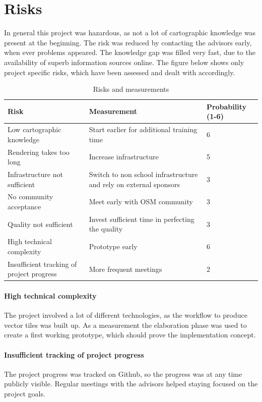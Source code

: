 \section{Risks}\label{risks}
In general this project was hazardous, as not a lot of cartographic knowledge was present at the beginning. The risk was reduced by contacting the advisors early, when ever problems appeared. The knowledge gap was filled very fast, due to the availability of superb information sources online. The figure below shows only project specific risks, which have been assessed and dealt with accordingly.

\begin{table}[H]
\centering
    \begin{tabular}{p{4.5cm} p{5.5cm} p{1.8cm}}
    \hline
    Risk & Measurement & Probability (1-6)\\
    \hline
    Low cartographic knowledge & Start earlier for additional training time & 6\\
    Rendering takes too long & Increase infrastructure & 5\\
    Infrastructure not sufficient & Switch to non school infrastructure and rely on external sponsors & 3\\
    No community acceptance & Meet early with OSM community & 3\\
    Quality not sufficient & Invest sufficient time in perfecting the quality & 3\\
    High technical complexity & Prototype early & 6\\
    Insufficient tracking of project progress & More frequent meetings & 2\\
    \end{tabular}
    \caption{Risks and measurements}
\end{table}

\paragraph{High technical complexity} The project involved a lot of different technologies, as the workflow to produce vector tiles was built up. As a measurement the elaboration phase was used to create a first working prototype, which should prove the implementation concept.

\paragraph{Insufficient tracking of project progress} The project progress was tracked on Github, so the progress was at any time publicly visible. Regular meetings with the advisors helped staying focused on the project goals.

